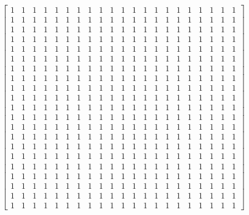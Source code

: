 \documentclass[10pt]{article}
\begin{document}
$\left[\begin{array}{lllllllllllllllllllllll}\hline 1 & 1 & 1 & 1 & 1 & 1 & 1 & 1 & 1 & 1 & 1 & 1 & 1 & 1 & 1 & 1 & 1 & 1 & 1 & 1 & 1 \\ 1 & 1 & 1 & 1 & 1 & 1 & 1 & 1 & 1 & 1 & 1 & 1 & 1 & 1 & 1 & 1 & 1 & 1 & 1 & 1 & 1 \\ 1 & 1 & 1 & 1 & 1 & 1 & 1 & 1 & 1 & 1 & 1 & 1 & 1 & 1 & 1 & 1 & 1 & 1 & 1 & 1 & 1 \\ 1 & 1 & 1 & 1 & 1 & 1 & 1 & 1 & 1 & 1 & 1 & 1 & 1 & 1 & 1 & 1 & 1 & 1 & 1 & 1 & 1 \\ 1 & 1 & 1 & 1 & 1 & 1 & 1 & 1 & 1 & 1 & 1 & 1 & 1 & 1 & 1 & 1 & 1 & 1 & 1 & 1 & 1 \\ 1 & 1 & 1 & 1 & 1 & 1 & 1 & 1 & 1 & 1 & 1 & 1 & 1 & 1 & 1 & 1 & 1 & 1 & 1 & 1 & 1 \\ 1 & 1 & 1 & 1 & 1 & 1 & 1 & 1 & 1 & 1 & 1 & 1 & 1 & 1 & 1 & 1 & 1 & 1 & 1 & 1 & 1 \\ 1 & 1 & 1 & 1 & 1 & 1 & 1 & 1 & 1 & 1 & 1 & 1 & 1 & 1 & 1 & 1 & 1 & 1 & 1 & 1 & 1 \\ 1 & 1 & 1 & 1 & 1 & 1 & 1 & 1 & 1 & 1 & 1 & 1 & 1 & 1 & 1 & 1 & 1 & 1 & 1 & 1 & 1 \\ 1 & 1 & 1 & 1 & 1 & 1 & 1 & 1 & 1 & 1 & 1 & 1 & 1 & 1 & 1 & 1 & 1 & 1 & 1 & 1 & 1 \\ 1 & 1 & 1 & 1 & 1 & 1 & 1 & 1 & 1 & 1 & 1 & 1 & 1 & 1 & 1 & 1 & 1 & 1 & 1 & 1 & 1 \\ 1 & 1 & 1 & 1 & 1 & 1 & 1 & 1 & 1 & 1 & 1 & 1 & 1 & 1 & 1 & 1 & 1 & 1 & 1 & 1 & 1 \\ 1 & 1 & 1 & 1 & 1 & 1 & 1 & 1 & 1 & 1 & 1 & 1 & 1 & 1 & 1 & 1 & 1 & 1 & 1 & 1 & 1 \\ 1 & 1 & 1 & 1 & 1 & 1 & 1 & 1 & 1 & 1 & 1 & 1 & 1 & 1 & 1 & 1 & 1 & 1 & 1 & 1 & 1 \\ 1 & 1 & 1 & 1 & 1 & 1 & 1 & 1 & 1 & 1 & 1 & 1 & 1 & 1 & 1 & 1 & 1 & 1 & 1 & 1 & 1 \\ 1 & 1 & 1 & 1 & 1 & 1 & 1 & 1 & 1 & 1 & 1 & 1 & 1 & 1 & 1 & 1 & 1 & 1 & 1 & 1 & 1 \\ 1 & 1 & 1 & 1 & 1 & 1 & 1 & 1 & 1 & 1 & 1 & 1 & 1 & 1 & 1 & 1 & 1 & 1 & 1 & 1 & 1 \\ 1 & 1 & 1 & 1 & 1 & 1 & 1 & 1 & 1 & 1 & 1 & 1 & 1 & 1 & 1 & 1 & 1 & 1 & 1 & 1 & 1 \\ 1 & 1 & 1 & 1 & 1 & 1 & 1 & 1 & 1 & 1 & 1 & 1 & 1 & 1 & 1 & 1 & 1 & 1 & 1 & 1 & 1 \\ 1 & 1 & 1 & 1 & 1 & 1 & 1 & 1 & 1 & 1 & 1 & 1 & 1 & 1 & 1 & 1 & 1 & 1 & 1 & 1 & 1 \\ 1 & 1 & 1 & 1 & 1 & 1 & 1 & 1 & 1 & 1 & 1 & 1 & 1 & 1 & 1 & 1 & 1 & 1 & 1 & 1 & 1\end{array}\right]$
\end{document}
